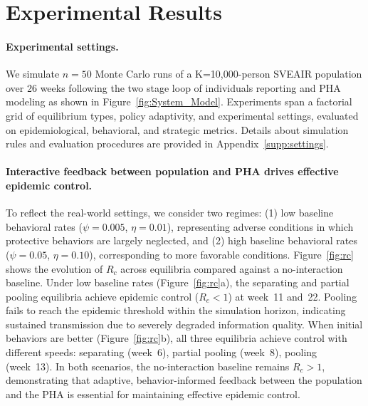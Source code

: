 \documentclass[sigconf,review]{acmart}
\begin{document}
\section{Experimental Results}

\paragraph{Experimental settings.}
We simulate $n=50$ Monte Carlo runs of a K=10{,}000-person SVEAIR population over 26 weeks following the two stage loop of individuals reporting and PHA modeling as shown in Figure~\ref{fig:System_Model}.
Experiments span a factorial grid of equilibrium types, policy adaptivity, and experimental settings, evaluated on epidemiological, behavioral, and strategic metrics.
Details about simulation rules and evaluation procedures are provided in Appendix~\ref{supp:settings}. %

\paragraph{Interactive feedback between population and PHA drives effective epidemic control.}
To reflect the real-world settings, we consider two regimes: (1) low baseline behavioral rates ($\psi=0.005$, $\eta=0.01$), representing adverse conditions in which protective behaviors are largely neglected, and (2) high baseline behavioral rates ($\psi=0.05$, $\eta=0.10$), corresponding to more favorable conditions.
Figure~\ref{fig:rc} shows the evolution of $R_c$ across equilibria compared against a no-interaction baseline. 
Under low baseline rates (Figure~\ref{fig:rc}a), the separating and partial pooling equilibria achieve epidemic control ($R_c <1$) at week~11 and~22. Pooling fails to reach the epidemic threshold within the simulation horizon, indicating sustained transmission due to severely degraded information quality.
When initial behaviors are better (Figure~\ref{fig:rc}b), all three equilibria achieve control with different speeds: separating (week~6), partial pooling (week~8), pooling (week~13). 
In both scenarios, the no-interaction baseline remains $R_c > 1$, demonstrating that adaptive, behavior-informed feedback between the population and the PHA is essential for maintaining effective epidemic control.
\end{document}
